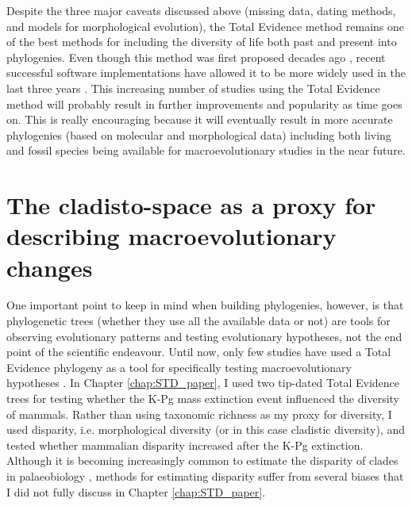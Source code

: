 Despite the three major caveats discussed above (missing data, dating methods, and models for morphological evolution), the Total Evidence method remains one of the best methods for including the diversity of life both past and present into phylogenies.
Even though this method was first proposed decades ago \citep[e.g.][]{eernissetaxonomic1993}, recent successful software implementations \citep{Ronquist2012mrbayes,BEAST2} have allowed it to be more widely used in the last three years \citep{ronquista2012,Slater2012MEE,Wood01032013,schragocombining2013,beckancient2014,Arcila2015131,Dembo2015,Klopfstein12082015,Carrizo,Wittenberg2015TEM,gavryushkina2015bayesian}.
This increasing number of studies using the Total Evidence method will probably result in further improvements and popularity as time goes on.
This is really encouraging because it will eventually result in more accurate phylogenies (based on molecular and morphological data) including both living and fossil species being available for macroevolutionary studies in the near future. 


\section{The cladisto-space as a proxy for describing macroevolutionary changes} 
One important point to keep in mind when building phylogenies, however, is that phylogenetic trees (whether they use all the available data or not) are tools for observing evolutionary patterns and testing evolutionary hypotheses, not the end point of the scientific endeavour.
Until now, only few studies have used a Total Evidence phylogeny as a tool for specifically testing macroevolutionary hypotheses \citep[e.g.][]{Slater2012MEE,Wood01032013,Dembo2015}.
In Chapter \ref{chap:STD_paper}, I used two tip-dated Total Evidence trees for testing whether the K-Pg mass extinction event influenced the diversity of mammals.
Rather than using taxonomic richness as my proxy for diversity, I used disparity, i.e. morphological diversity (or in this case cladistic diversity), and tested whether mammalian disparity increased after the K-Pg extinction.
Although it is becoming increasingly common to estimate the disparity of clades in palaeobiology \citep[e.g.][]{Butler2012,brusattedinosaur2012,toljagictriassic-jurassic2013,brusattegradual2014,bensonfaunal2014,Claddis,Close2015}, methods for estimating disparity suffer from several biases that I did not fully discuss in Chapter \ref{chap:STD_paper}.

